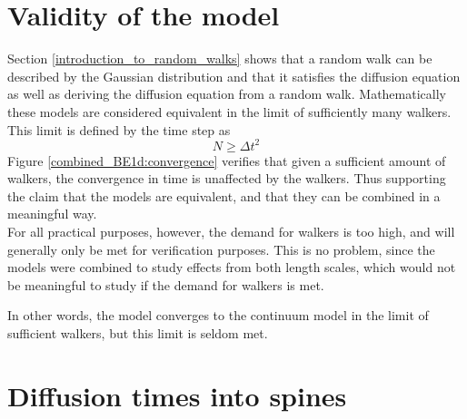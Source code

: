 \documentclass[main.tex]{subfiles}
\begin{document}
 

\section{Validity of the model}

Section \ref{introduction_to_random_walks} shows that a random walk can be described by the Gaussian distribution and that it satisfies the diffusion equation as well as deriving the diffusion equation from a random walk. 
Mathematically these models are considered equivalent in the limit of sufficiently many walkers. 
This limit is defined by the time step as 
\begin{equation}
 N \geq \Delta t^2
\end{equation}
Figure \ref{combined_BE1d:convergence} verifies that given a sufficient amount of walkers, the convergence in time is unaffected by the walkers. 
Thus supporting the claim that the models are equivalent, and that they can be combined in a meaningful way. \\

For all practical purposes, however, the demand for walkers is too high, and will generally only be met for verification purposes. 
This is no problem, since the models were combined to study effects from both length scales, which would not be meaningful to study if the demand for walkers is met. 

In other words, the model converges to the continuum model in the limit of sufficient walkers, but this limit is seldom met.


\section{Diffusion times into spines}
\end{document}

